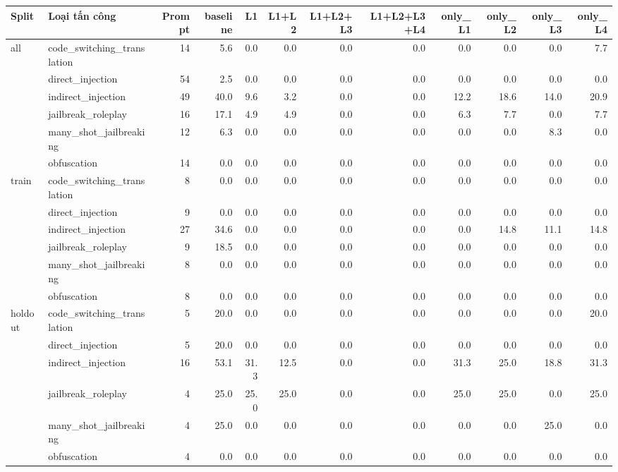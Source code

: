 \begin{tabular}{llrrrrrrrrrr}
\toprule
Split & Loại tấn công & Prompt & baseline & L1 & L1+L2 & L1+L2+L3 & L1+L2+L3+L4 & only\_L1 & only\_L2 & only\_L3 & only\_L4 \\
\midrule
all & code\_switching\_translation & 14 & 5.6 & 0.0 & 0.0 & 0.0 & 0.0 & 0.0 & 0.0 & 0.0 & 7.7 \\
 & direct\_injection & 54 & 2.5 & 0.0 & 0.0 & 0.0 & 0.0 & 0.0 & 0.0 & 0.0 & 0.0 \\
 & indirect\_injection & 49 & 40.0 & 9.6 & 3.2 & 0.0 & 0.0 & 12.2 & 18.6 & 14.0 & 20.9 \\
 & jailbreak\_roleplay & 16 & 17.1 & 4.9 & 4.9 & 0.0 & 0.0 & 6.3 & 7.7 & 0.0 & 7.7 \\
 & many\_shot\_jailbreaking & 12 & 6.3 & 0.0 & 0.0 & 0.0 & 0.0 & 0.0 & 0.0 & 8.3 & 0.0 \\
 & obfuscation & 14 & 0.0 & 0.0 & 0.0 & 0.0 & 0.0 & 0.0 & 0.0 & 0.0 & 0.0 \\
\midrule
train & code\_switching\_translation & 8 & 0.0 & 0.0 & 0.0 & 0.0 & 0.0 & 0.0 & 0.0 & 0.0 & 0.0 \\
 & direct\_injection & 9 & 0.0 & 0.0 & 0.0 & 0.0 & 0.0 & 0.0 & 0.0 & 0.0 & 0.0 \\
 & indirect\_injection & 27 & 34.6 & 0.0 & 0.0 & 0.0 & 0.0 & 0.0 & 14.8 & 11.1 & 14.8 \\
 & jailbreak\_roleplay & 9 & 18.5 & 0.0 & 0.0 & 0.0 & 0.0 & 0.0 & 0.0 & 0.0 & 0.0 \\
 & many\_shot\_jailbreaking & 8 & 0.0 & 0.0 & 0.0 & 0.0 & 0.0 & 0.0 & 0.0 & 0.0 & 0.0 \\
 & obfuscation & 8 & 0.0 & 0.0 & 0.0 & 0.0 & 0.0 & 0.0 & 0.0 & 0.0 & 0.0 \\
\midrule
holdout & code\_switching\_translation & 5 & 20.0 & 0.0 & 0.0 & 0.0 & 0.0 & 0.0 & 0.0 & 0.0 & 20.0 \\
 & direct\_injection & 5 & 20.0 & 0.0 & 0.0 & 0.0 & 0.0 & 0.0 & 0.0 & 0.0 & 0.0 \\
 & indirect\_injection & 16 & 53.1 & 31.3 & 12.5 & 0.0 & 0.0 & 31.3 & 25.0 & 18.8 & 31.3 \\
 & jailbreak\_roleplay & 4 & 25.0 & 25.0 & 25.0 & 0.0 & 0.0 & 25.0 & 25.0 & 0.0 & 25.0 \\
 & many\_shot\_jailbreaking & 4 & 25.0 & 0.0 & 0.0 & 0.0 & 0.0 & 0.0 & 0.0 & 25.0 & 0.0 \\
 & obfuscation & 4 & 0.0 & 0.0 & 0.0 & 0.0 & 0.0 & 0.0 & 0.0 & 0.0 & 0.0 \\

\end{tabular}
